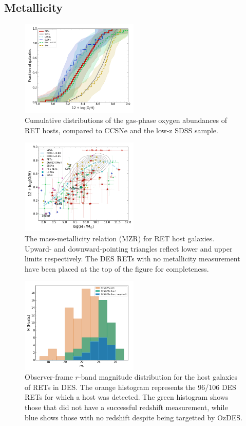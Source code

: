 \documentclass[fleqn,usenatbib,]{mnras}
\newcommand{\replylluis}[1]{\color{green}#1 \color{black}}
\begin{document}
\subsection{Metallicity \label{subsec:res_metallicity}}

\begin{figure}
\includegraphics[width=0.5\textwidth]{figs/RET_OH_cum.png}
\caption{Cumulative distributions of the gas-phase oxygen abundances of RET hosts, compared to CCSNe and the low-z SDSS sample.
\label{fig:oh_cum}}
\end{figure}

\begin{figure}
\includegraphics[width=0.5\textwidth]{figs/RET_MZR.png}
\caption{The mass-metallicity relation (MZR) for RET host galaxies. \replylluis{Upward- and downward-pointing triangles reflect lower and upper limits respectively. The DES RETs with no metallicity measurement have been placed at the top of the figure for completeness.}
\label{fig:mzr}}
\end{figure}

\begin{figure}
\includegraphics[width=0.5\textwidth]{figs/mag_dist.png}
\caption{Observer-frame $r$-band magnitude distribution for the host galaxies of RETs in DES. The orange histogram represents the 96/106 DES RETs for which a host was detected. The green histogram shows those that did not have a successful redshift measurement, while blue shows those with no redshift despite being targetted by OzDES.
\label{fig:mag_dist}}
\end{figure}
\end{document}
